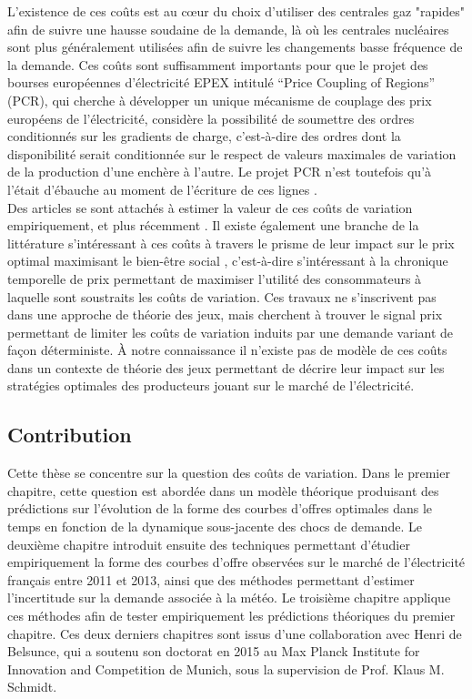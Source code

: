L'existence de ces coûts est au c\oe{}ur du choix d'utiliser des centrales gaz "rapides" afin de suivre une hausse soudaine de la demande, là où les centrales nucléaires sont plus généralement utilisées afin de suivre les changements basse fréquence de la demande. Ces coûts sont suffisamment importants pour que le projet des bourses européennes d'électricité EPEX intitulé ``Price Coupling of Regions'' (PCR), qui cherche à développer un unique mécanisme de couplage des prix européens de l'électricité, considère la possibilité de soumettre des ordres conditionnés sur les gradients de charge, c'est-à-dire des ordres dont la disponibilité serait conditionnée sur le respect de valeurs maximales de variation de la production d'une enchère à l'autre. Le projet PCR n'est toutefois qu'à l'était d'ébauche au moment de l'écriture de ces lignes \cite{EPEXPCR}.\\

Des articles se sont attachés à estimer la valeur de ces coûts de variation empiriquement, \cite{wolak2007quantifying} et plus récemment \cite{reguant2011welfare}. Il existe également une branche de la littérature s'intéressant à ces coûts à travers le prisme de leur impact sur le prix optimal maximisant le bien-être social \cite{tanaka2006real}, c'est-à-dire s'intéressant à la chronique temporelle de prix permettant de maximiser l'utilité des consommateurs à laquelle sont soustraits les coûts de variation. Ces travaux ne s'inscrivent pas dans une approche de théorie des jeux, mais cherchent à trouver le signal prix permettant de limiter les coûts de variation induits par une demande variant de façon déterministe. \`A notre connaissance il n'existe pas de modèle de ces coûts dans un contexte de théorie des jeux permettant de décrire leur impact sur les stratégies optimales des producteurs jouant sur le marché de l'électricité.

\subsection*{Contribution}
Cette thèse se concentre sur la question des coûts de variation. Dans le premier chapitre, cette question est abordée dans un modèle théorique produisant des prédictions sur l'évolution de la forme des courbes d'offres optimales dans le temps en fonction de la dynamique sous-jacente des chocs de demande. Le deuxième chapitre introduit ensuite des techniques permettant d'étudier empiriquement la forme des courbes d'offre observées sur le marché de l'électricité français entre 2011 et 2013, ainsi que des méthodes permettant d'estimer l'incertitude sur la demande associée à la météo. Le troisième chapitre applique ces méthodes afin de tester empiriquement les prédictions théoriques du premier chapitre. Ces deux derniers chapitres sont issus d'une collaboration avec Henri de Belsunce, qui a soutenu son doctorat en 2015 au Max Planck Institute for Innovation and Competition de Munich, sous la supervision de Prof. Klaus M. Schmidt.\\

